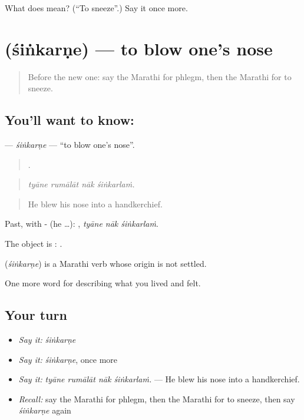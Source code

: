\begin{tcolorbox}[breakable,colback=teal!4,colframe=teal!35!black,title={Before you move on}]
What does  mean? (\textquotedblleft{}To sneeze\textquotedblright{}.) Say it once more.
\end{tcolorbox}
\section[\texorpdfstring{\mr{शिंकरणे} (śiṅkarṇe)}{शिंकरणे (śiṅkarṇe)}]{ (śiṅkarṇe) — to blow one's nose}

\label{lesson:MR-C481-sinkarne}



\begin{quote}
Before the new one: say the Marathi for phlegm, then the Marathi for to sneeze.
\end{quote}

\subsection*{You'll want to know: }
\textbf{} — \emph{śiṅkarṇe} — \textquotedblleft{}to blow one's nose\textquotedblright{}.

\begin{quote}
   .
\end{quote}

\begin{quote}
\emph{tyāne rumālāt nāk śiṅkarlaṁ.}
\end{quote}

\begin{quote}
He blew his nose into a handkerchief.
\end{quote}

Past, with - (he …):   , \emph{tyāne nāk śiṅkarlaṁ}.

The object is :  .

\begin{cousinweb}
\textbf{} (\emph{śiṅkarṇe}) is a Marathi verb whose origin is not settled.
\end{cousinweb}

\begin{grammarlens}[title={What you've built}]
One more word for describing what you lived and felt.
\end{grammarlens}

\subsection*{Your turn}
\begin{itemize}
\raggedright
  \item \emph{Say it:} \emph{śiṅkarṇe}
  \item \emph{Say it:} \emph{śiṅkarṇe}, once more
  \item \emph{Say it:} \emph{tyāne rumālāt nāk śiṅkarlaṁ.} — He blew his nose into a handkerchief.
  \item \emph{Recall:} say the Marathi for phlegm, then the Marathi for to sneeze, then say \emph{śiṅkarṇe} again
\end{itemize}

